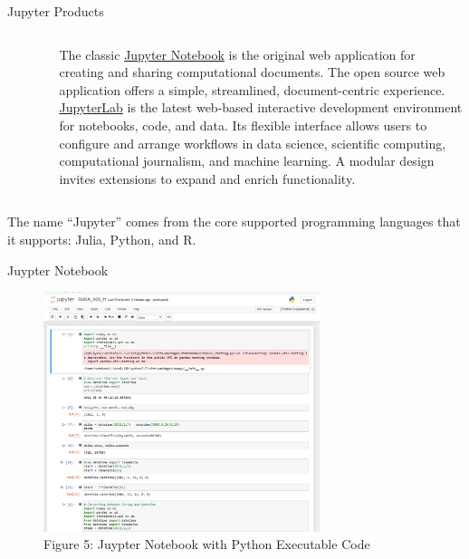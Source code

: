 \documentclass[pdf]{beamer}
\theoremstyle{remark}
\theoremstyle{definition}
\begin{document}
\begin{frame}[t]{Jupyter Products}
\begin{columns}[T]
\begin{column}{0.2\textwidth}
\begin{figure}[htbp]
  \captionsetup{justification=centering}
  \includegraphics[height=1.2cm, trim=0.1cm 0.1cm 0.1cm 0.1cm width=1.2cm]{Images/Juypter.png}
\end{figure}
\end{column}
\begin{column}{0.7\textwidth}  %
The classic \href{https://jupyter.org/}{Jupyter Notebook} is the original web application for creating and sharing computational documents. The open source web application offers a simple, streamlined, document-centric experience. \\
\vspace{1.5ex}
\href{http://jupyter.org/try}{JupyterLab} is the latest web-based interactive development environment for notebooks, code, and data. Its flexible interface allows users to configure and arrange workflows in data science, scientific computing, computational journalism, and machine learning. A modular design invites extensions to expand and enrich functionality.
\end{column}
\end{columns}
The name ``Jupyter'' comes from the core supported programming languages that it supports: Julia, Python, and R.%
\end{frame}

\begin{frame}[t]{Juypter Notebook}
\begin{figure}[htbp]
  \captionsetup{justification=centering}
  \includegraphics[height=7cm, trim=0.0cm 0.0cm 0.0cm 0.0cm width=7cm]{Images/Jupyter_Python.png}
  \caption{Figure {\color{franklinblue} 5}: Juypter Notebook with Python Executable Code}
\end{figure}
\end{frame}
\end{document}
